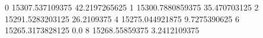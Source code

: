 0 15307.537109375 42.2197265625
1 15300.7880859375 35.470703125
2 15291.5283203125 26.2109375
4 15275.044921875 9.7275390625
6 15265.3173828125 0.0
8 15268.55859375 3.2412109375
